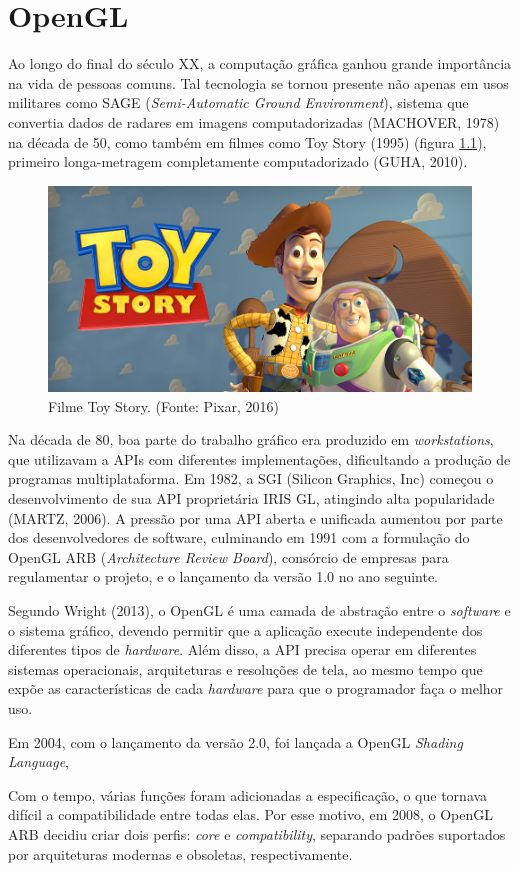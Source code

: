 \chapter{OpenGL}
Ao longo do final do século XX, a computação gráfica ganhou grande importância na vida de pessoas comuns. Tal tecnologia se tornou presente não apenas em usos militares como SAGE (\textit{Semi-Automatic Ground Environment}), sistema que convertia dados de radares em imagens computadorizadas (MACHOVER, 1978) na década de 50, como também em filmes como Toy Story (1995) (figura \ref{fig:toy-story}), primeiro longa-metragem completamente computadorizado (GUHA, 2010).

\begin{figure}[h]
	\centering
	\includegraphics[scale=0.35]{imagens/toy-story.jpg}
	\caption{\small Filme Toy Story. (Fonte: Pixar, 2016)}
	\label{fig:toy-story}
\end{figure}

Na década de 80, boa parte do trabalho gráfico era produzido em \textit{workstations}, que utilizavam a APIs com diferentes implementações, dificultando a produção de programas multiplataforma. Em 1982, a SGI (Silicon Graphics, Inc) começou o desenvolvimento de sua API proprietária IRIS GL, atingindo alta popularidade (MARTZ, 2006). A pressão por uma API aberta e unificada aumentou por parte dos desenvolvedores de software, culminando em 1991 com a formulação do OpenGL ARB (\textit{Architecture Review Board}), consórcio de empresas para regulamentar o projeto, e o lançamento da versão 1.0 no ano seguinte.

Segundo Wright (2013), o OpenGL é uma camada de abstração entre o \textit{software} e o sistema gráfico, devendo permitir que a aplicação execute independente dos diferentes tipos de \textit{hardware}. Além disso, a API precisa operar em diferentes sistemas operacionais, arquiteturas e resoluções de tela, ao mesmo tempo que expõe as características de cada \textit{hardware} para que o programador faça o melhor uso.

Em 2004, com o lançamento da versão 2.0, foi lançada a OpenGL \textit{Shading Language},

Com o tempo, várias funções foram adicionadas a especificação, o que tornava difícil a compatibilidade entre todas elas. Por esse motivo, em 2008, o OpenGL ARB decidiu criar dois perfis: \textit{core} e \textit{compatibility}, separando padrões suportados por arquiteturas modernas e obsoletas, respectivamente.